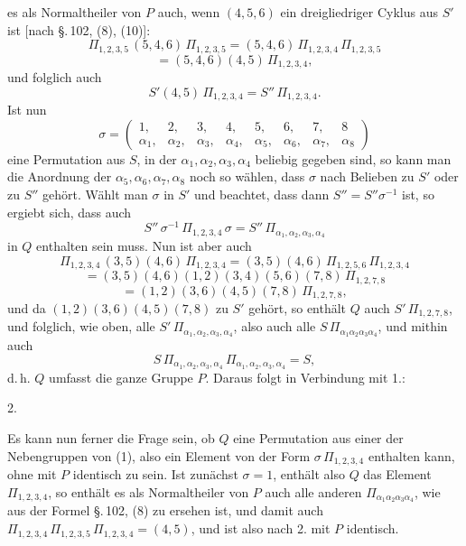 
es als Normaltheiler von $P$ auch, wenn $(4,5,6)$ ein dreigliedriger Cyklus aus $S'$ ist [nach \S.\,102, (8), (10)]:
\[
\Pi_{1,2,3,5}\,(5,4,6)\,\Pi_{1,2,3,5} = (5,4,6)\,\Pi_{1,2,3,4}\,\Pi_{1,2,3,5}
\]
\[
= (5,4,6)(4,5)\,\Pi_{1,2,3,4},
\]
und folglich auch
\[
S'(4,5)\,\Pi_{1,2,3,4} = S''\,\Pi_{1,2,3,4}.
\]
Ist nun
\[
\sigma = \begin{pmatrix} 1, & 2, & 3, & 4, & 5, & 6, & 7, & 8 \\ \alpha_1, & \alpha_2, & \alpha_3, & \alpha_4, & \alpha_5, & \alpha_6, & \alpha_7, & \alpha_8 \end{pmatrix}
\]
eine Permutation aus $S$, in der $\alpha_1, \alpha_2, \alpha_3, \alpha_4$ beliebig gegeben sind, so kann man die Anordnung der $\alpha_5, \alpha_6, \alpha_7, \alpha_8$ noch so wählen, dass $\sigma$ nach Belieben zu $S'$ oder zu $S''$ gehört. Wählt man $\sigma$ in $S'$ und beachtet, dass dann $S'' = S''\sigma^{-1}$ ist, so ergiebt sich, dass auch
\[
S''\,\sigma^{-1}\,\Pi_{1,2,3,4}\,\sigma = S''\,\Pi_{\alpha_1,\alpha_2,\alpha_3,\alpha_4}
\]
in $Q$ enthalten sein muss. Nun ist aber auch
\[
\Pi_{1,2,3,4}\,(3,5)(4,6)\,\Pi_{1,2,3,4} = (3,5)(4,6)\,\Pi_{1,2,5,6}\,\Pi_{1,2,3,4}
\]
\[
= (3,5)(4,6)(1,2)(3,4)(5,6)(7,8)\,\Pi_{1,2,7,8}
\]
\[
= (1,2)(3,6)(4,5)(7,8)\,\Pi_{1,2,7,8},
\]
und da $(1,2)(3,6)(4,5)(7,8)$ zu $S'$ gehört, so enthält $Q$ auch $S'\,\Pi_{1,2,7,8}$, und folglich, wie oben, alle $S'\,\Pi_{\alpha_1,\alpha_2,\alpha_3,\alpha_4}$, also auch alle $S\,\Pi_{\alpha_1\alpha_2\alpha_3\alpha_4}$, und mithin auch
\[
S\,\Pi_{\alpha_1,\alpha_2,\alpha_3,\alpha_4}\,\Pi_{\alpha_1,\alpha_2,\alpha_3,\alpha_4} = S,
\]
d.\,h. $Q$ umfasst die ganze Gruppe $P$. Daraus folgt in Verbindung mit 1.:

2.\ 

Es kann nun ferner die Frage sein, ob $Q$ eine Permutation aus einer der Nebengruppen von (1), also ein Element von der Form $\sigma\,\Pi_{1,2,3,4}$ enthalten kann, ohne mit $P$ identisch zu sein. Ist zunächst $\sigma = 1$, enthält also $Q$ das Element $\Pi_{1,2,3,4}$, so enthält es als Normaltheiler von $P$ auch alle anderen $\Pi_{\alpha_1\alpha_2\alpha_3\alpha_4}$, wie aus der Formel \S.\,102, (8) zu ersehen ist, und damit auch $\Pi_{1,2,3,4}\,\Pi_{1,2,3,5}\,\Pi_{1,2,3,4} = (4,5)$, und ist also nach 2. mit $P$ identisch.
